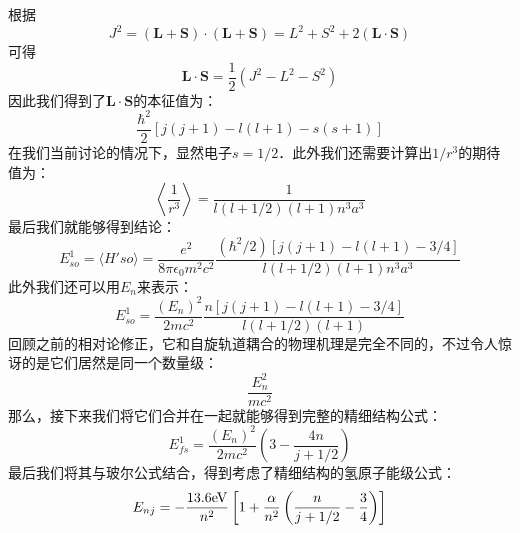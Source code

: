 根据
\begin{equation}
J^2 = (\mathbf{L+S})\cdot(\mathbf{L+S})=L^2+S^2+2(\mathbf{L\cdot S})
\end{equation}
可得
\begin{equation}
\mathbf{L\cdot S}=\frac{1}{2}(J^2-L^2-S^2)
\end{equation}
因此我们得到了$\mathbf{L\cdot S}$的本征值为：
\begin{equation}
\frac{\hbar^2}{2}[j(j+1)-l(l+1)-s(s+1)]
\end{equation}
在我们当前讨论的情况下，显然电子$s=1/2$．此外我们还需要计算出$1/r^3$的期待值为：
\begin{equation}
\left\langle \frac{1}{r^3}\right\rangle = \frac{1}{l(l+1/2)(l+1)n^3a^3}
\end{equation}
最后我们就能够得到结论：
\begin{equation}
E^1_{so}=\langle H'{so}\rangle = \frac{e^2}{8\pi \epsilon_0 m^2 c^2}\frac{(\hbar^2/2)[j(j+1)-l(l+1)-3/4]}{l(l+1/2)(l+1)n^3a^3}
\end{equation}
此外我们还可以用$E_n$来表示：
\begin{equation}
E^1_{so}=\frac{(E_n)^2}{2mc^2}\frac{n[j(j+1)-l(l+1)-3/4]}{l(l+1/2)(l+1)}
\end{equation}
回顾之前的相对论修正，它和自旋轨道耦合的物理机理是完全不同的，不过令人惊讶的是它们居然是同一个数量级：
\begin{equation}
\frac{E_n^2}{mc^2}
\end{equation}
那么，接下来我们将它们合并在一起就能够得到完整的精细结构公式：
\begin{equation}
E_{fs}^1=\frac{(E_n)^2}{2mc^2}\left(3-\frac{4n}{j+1/2}\right)
\end{equation}
最后我们将其与玻尔公式结合，得到考虑了精细结构的氢原子能级公式：
\begin{equation}
E_{nj}=-\frac{13.6\rm{eV}}{n^2}\left[1+\frac{\alpha}{n^2}\left(\frac{n}{j+1/2}-\frac{3}{4}\right)\right]
\end{equation}





